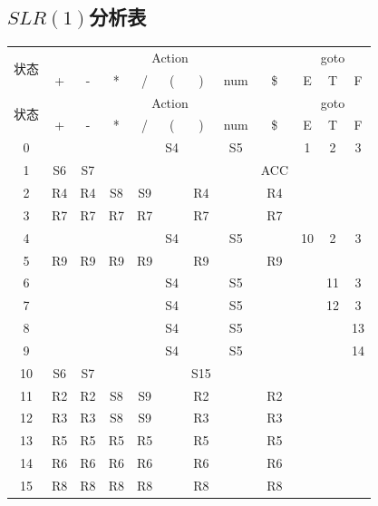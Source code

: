 \documentclass[UTF8]{ctexart}
\begin{document}
\subsection{$SLR(1)$分析表}
\begin{longtable}[c]{|c|c|c|c|c|c|c|c|c|c|c|c|}
    \hline
    \multirow{2}{*}{状态} & \multicolumn{8}{c|}{Action}              & \multicolumn{3}{c|}{goto} \\ \cline{2-12} 
                        & +  & -  & *  & /  & (  & )   & num & \$  & E       & T      & F      \\ \hline
    \endfirsthead
    \hline
    \multirow{2}{*}{状态} & \multicolumn{8}{c|}{Action}              & \multicolumn{3}{c|}{goto} \\ \cline{2-12} 
                        & +  & -  & *  & /  & (  & )   & num & \$  & E       & T      & F      \\ \hline
    \endhead
    0                   &    &    &    &    & S4 &     & S5  &     & 1       & 2      & 3      \\ \hline
    1                   & S6 & S7 &    &    &    &     &     & ACC &         &        &        \\ \hline
    2                   & R4 & R4 & S8 & S9 &    & R4  &     & R4  &         &        &        \\ \hline
    3                   & R7 & R7 & R7 & R7 &    & R7  &     & R7  &         &        &        \\ \hline
    4                   &    &    &    &    & S4 &     & S5  &     & 10      & 2      & 3      \\ \hline
    5                   & R9 & R9 & R9 & R9 &    & R9  &     & R9  &         &        &        \\ \hline
    6                   &    &    &    &    & S4 &     & S5  &     &         & 11     & 3      \\ \hline
    7                   &    &    &    &    & S4 &     & S5  &     &         & 12     & 3      \\ \hline
    8                   &    &    &    &    & S4 &     & S5  &     &         &        & 13     \\ \hline
    9                   &    &    &    &    & S4 &     & S5  &     &         &        & 14     \\ \hline
    10                  & S6 & S7 &    &    &    & S15 &     &     &         &        &        \\ \hline
    11                  & R2 & R2 & S8 & S9 &    & R2  &     & R2  &         &        &        \\ \hline
    12                  & R3 & R3 & S8 & S9 &    & R3  &     & R3  &         &        &        \\ \hline
    13                  & R5 & R5 & R5 & R5 &    & R5  &     & R5  &         &        &        \\ \hline
    14                  & R6 & R6 & R6 & R6 &    & R6  &     & R6  &         &        &        \\ \hline
    15                  & R8 & R8 & R8 & R8 &    & R8  &     & R8  &         &        &        \\ \hline
    \end{longtable}
\end{document}
